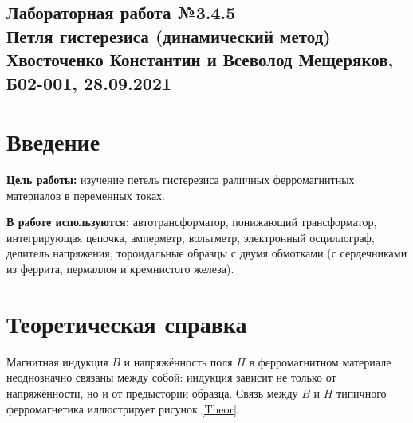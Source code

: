 \documentclass[a4paper,10pt]{article}
\begin{document}
  
\begin{center}
  \section*{Лабораторная работа №3.4.5 \\Петля гистерезиса (динамический метод)\\Хвосточенко Константин и Всеволод Мещеряков, Б02-001, 28.09.2021}
\end{center}  

\vspace{5mm}
\section*{Введение}

\begin{flushleft}
  \textbf{Цель работы:} изучение петель гистерезиса раличных ферромагнитных материалов в переменных токах.

\end{flushleft}

\begin{flushleft}
  \textbf{В работе используются:} автотрансформатор, понижающий трансформатор, интегрирующая цепочка, амперметр, вольтметр, электронный осциллограф, делитель напряжения, тороидальные образцы с двумя обмотками (с сердечниками из феррита, пермаллоя и кремнистого железа).

\end{flushleft}

\section*{Теоретическая справка}

Магнитная индукция $B$ и напряжённость поля $H$ в ферромагнитном материале неоднозначно связаны между собой: индукция зависит не только от напряжённости, но и от предыстории образца. Связь между $B$ и $H$ типичного ферромагнетика иллюстрирует рисунок \ref{Theor}.
\end{document}
